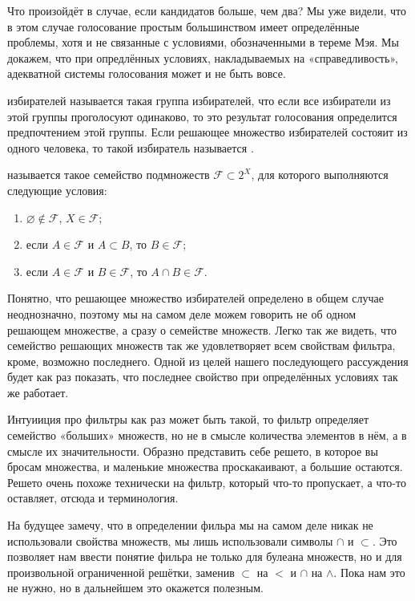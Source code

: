 Что произойдёт в случае, если кандидатов больше, чем два? Мы уже видели, что в этом случае голосование простым большинством имеет определённые проблемы, хотя и не связанные с условиями, обозначенными в тереме Мэя. Мы докажем, что при опредлённых условиях, накладываемых на «справедливость», адекватной системы голосования может и не быть вовсе.

\begin{definition}
 избирателей называется такая группа избирателей, что если все избиратели из этой группы проголосуют одинаково, то это результат голосования определится предпочтением этой группы. Если решающее множество избирателей состояит из одного человека, то такой избиратель называется .
\end{definition}

\begin{definition}
 называется такое семейство подмножеств $\mathcal{F}\subset 2^X$, для которого выполняются следующие условия:
\begin{enumerate}
\item $\varnothing \not\in \mathcal{F}$, $X\in\mathcal{F}$;
\item если $A\in\mathcal{F}$ и $A\subset B$, то $B\in \mathcal{F}$;
\item если $A\in\mathcal{F}$ и $B\in\mathcal{F}$, то $A\cap B\in\mathcal{F}$.
\end{enumerate}
\end{definition}

Понятно, что решающее множество избирателей определено в общем случае неоднозначно, поэтому мы на самом деле можем говорить не об одном решающем множестве, а сразу о семействе множеств. Легко так же видеть, что семейство решающих множеств так же удовлетворяет всем свойствам фильтра, кроме, возможно последнего. Одной из целей нашего последующего рассуждения будет как раз показать, что последнее свойство при определённых условиях так же работает.

Интуииция про фильтры как раз может быть такой, то фильтр определяет семейство «больших» множеств, но не в смысле количества элементов в нём, а в смысле их значительности. Образно представить себе решето, в которое вы бросам множества, и маленькие множества проскакаивают, а большие остаются. Решето очень похоже технически на фильтр, который что-то пропускает, а что-то оставляет, отсюда и терминология.

На будущее замечу, что в определении фильра мы на самом деле никак не использовали свойства множеств, мы лишь использовали символы $\cap$ и $\subset$. Это позволяет нам ввести понятие фильра не только для булеана множеств, но и для произвольной ограниченной решётки, заменив $\subset$ на $<$ и $\cap$ на $\land$. Пока нам это не нужно, но в дальнейшем это окажется полезным.


